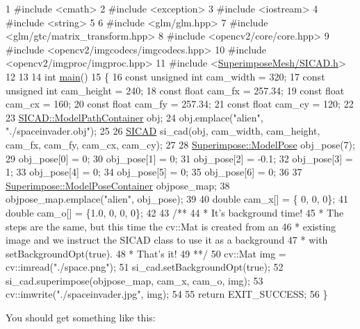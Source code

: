 \begin{DoxyCodeInclude}
1 \textcolor{preprocessor}{#include <cmath>}
2 \textcolor{preprocessor}{#include <exception>}
3 \textcolor{preprocessor}{#include <iostream>}
4 \textcolor{preprocessor}{#include <string>}
5 
6 \textcolor{preprocessor}{#include <glm/glm.hpp>}
7 \textcolor{preprocessor}{#include <glm/gtc/matrix\_transform.hpp>}
8 \textcolor{preprocessor}{#include <opencv2/core/core.hpp>}
9 \textcolor{preprocessor}{#include <opencv2/imgcodecs/imgcodecs.hpp>}
10 \textcolor{preprocessor}{#include <opencv2/imgproc/imgproc.hpp>}
11 \textcolor{preprocessor}{#include <\mbox{\hyperlink{SICAD_8h}{SuperimposeMesh/SICAD.h}}>}
12 
13 
14 \textcolor{keywordtype}{int} \mbox{\hyperlink{tutorial__background_8cpp_ae66f6b31b5ad750f1fe042a706a4e3d4}{main}}()
15 \{
16     \textcolor{keyword}{const} \textcolor{keywordtype}{unsigned} \textcolor{keywordtype}{int} cam\_width  = 320;
17     \textcolor{keyword}{const} \textcolor{keywordtype}{unsigned} \textcolor{keywordtype}{int} cam\_height = 240;
18     \textcolor{keyword}{const} \textcolor{keywordtype}{float}        cam\_fx     = 257.34;
19     \textcolor{keyword}{const} \textcolor{keywordtype}{float}        cam\_cx     = 160;
20     \textcolor{keyword}{const} \textcolor{keywordtype}{float}        cam\_fy     = 257.34;
21     \textcolor{keyword}{const} \textcolor{keywordtype}{float}        cam\_cy     = 120;
22 
23     \mbox{\hyperlink{classSICAD_a9e1e1460d4c0f331b4fd015aae4dd721}{SICAD::ModelPathContainer}} obj;
24     obj.emplace(\textcolor{stringliteral}{"alien"}, \textcolor{stringliteral}{"./spaceinvader.obj"});
25 
26     \mbox{\hyperlink{classSICAD}{SICAD}} si\_cad(obj, cam\_width, cam\_height, cam\_fx, cam\_fy, cam\_cx, cam\_cy);
27 
28     \mbox{\hyperlink{classSuperimpose_a85d40a5caf19f486d1e0c15c0a025378}{Superimpose::ModelPose}} obj\_pose(7);
29     obj\_pose[0] = 0;
30     obj\_pose[1] = 0;
31     obj\_pose[2] = -0.1;
32     obj\_pose[3] = 1;
33     obj\_pose[4] = 0;
34     obj\_pose[5] = 0;
35     obj\_pose[6] = 0;
36 
37     \mbox{\hyperlink{classSuperimpose_a178e3d4e2def6635bfcf9454dd4b5d22}{Superimpose::ModelPoseContainer}} objpose\_map;
38     objpose\_map.emplace(\textcolor{stringliteral}{"alien"}, obj\_pose);
39 
40     \textcolor{keywordtype}{double} cam\_x[] = \{  0, 0, 0\};
41     \textcolor{keywordtype}{double} cam\_o[] = \{1.0, 0, 0, 0\};
42 \textcolor{comment}{}
43 \textcolor{comment}{    /**}
44 \textcolor{comment}{     * It's background time!}
45 \textcolor{comment}{     * The steps are the same, but this time the cv::Mat is created from an}
46 \textcolor{comment}{     * existing image and we instruct the SICAD class to use it as a background}
47 \textcolor{comment}{     * with setBackgroundOpt(true).}
48 \textcolor{comment}{     * That's it!}
49 \textcolor{comment}{     **/}
50     cv::Mat img = cv::imread(\textcolor{stringliteral}{"./space.png"});
51     si\_cad.setBackgroundOpt(\textcolor{keyword}{true});
52     si\_cad.superimpose(objpose\_map, cam\_x, cam\_o, img);
53     cv::imwrite(\textcolor{stringliteral}{"./spaceinvader.jpg"}, img);
54 
55     \textcolor{keywordflow}{return} EXIT\_SUCCESS;
56 \}
\end{DoxyCodeInclude}


You should get something like this\+: 